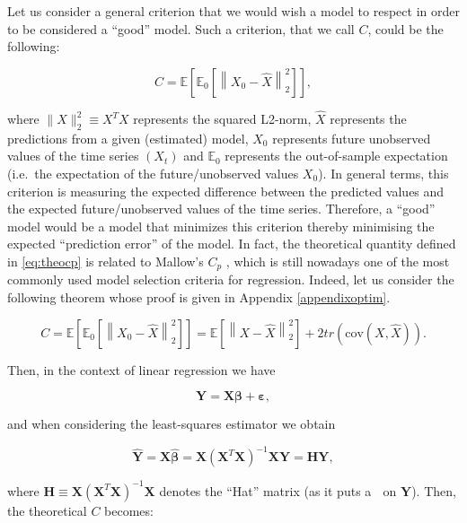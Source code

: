 \documentclass[]{book}
\theoremstyle{definition}
\theoremstyle{definition}
\theoremstyle{definition}
\theoremstyle{remark}
\let\BeginKnitrBlock\begin \let\EndKnitrBlock\end
\begin{document}
Let us consider a general criterion that we would wish a model to
respect in order to be considered a ``good'' model. Such a criterion,
that we call \(C\), could be the following:

\begin{equation}
C = \mathbb{E}\left[ {{\mathbb{E}_0}\left[ {\left\| {{X_0} - \hat X} \right\|_2^2} \right]} \right],
 \label{eq:theocp}
\end{equation}

where \(\|X\|_2^2 \equiv X^T X\) represents the squared L2-norm,
\(\hat{X}\) represents the predictions from a given (estimated) model,
\(X_0\) represents future unobserved values of the time series \((X_t)\)
and \(\mathbb{E}_0\) represents the out-of-sample expectation (i.e.~the
expectation of the future/unobserved values \(X_0\)). In general terms,
this criterion is measuring the expected difference between the
predicted values and the expected future/unobserved values of the time
series. Therefore, a ``good'' model would be a model that minimizes this
criterion thereby minimising the expected ``prediction error'' of the
model. In fact, the theoretical quantity defined in \eqref{eq:theocp} is
related to Mallow's \(C_p\) \citep[see][]{mallows1973some}, which is
still nowadays one of the most commonly used model selection criteria
for regression. Indeed, let us consider the following theorem whose
proof is given in Appendix \ref{appendixoptim}.

\BeginKnitrBlock{theorem}
\protect\hypertarget{thm:optimthm}{}{\label{thm:optimthm}
}\[C = \mathbb{E}\left[ {{\mathbb{E}_0}\left[ {\left\| {{X_0} - \hat X} \right\|_2^2} \right]} \right] = \mathbb{E}\left[ {\left\| {X - \hat X} \right\|_2^2} \right] + 2tr\left( {\text{cov}\left( {X,\hat X} \right)} \right).\]
\EndKnitrBlock{theorem}

Then, in the context of linear regression we have

\begin{equation*}
\mathbf{Y} = \mathbf{X} \boldsymbol{\beta} + \boldsymbol{\varepsilon},
\end{equation*}

and when considering the least-squares estimator we obtain

\begin{equation*}
\hat{\mathbf{Y}} = \mathbf{X} \hat{\boldsymbol{\beta}} = \mathbf{X} \left(\mathbf{X}^T \mathbf{X}\right)^{-1} \mathbf{X} \mathbf{Y} = \mathbf{H} \mathbf{Y},
\end{equation*}

where
\(\mathbf{H} \equiv \mathbf{X} \left(\mathbf{X}^T \mathbf{X}\right)^{-1} \mathbf{X}\)
denotes the ``Hat'' matrix (as it puts a 🎩 on \(\mathbf{Y}\)). Then, the
theoretical \(C\) becomes:
\end{document}

